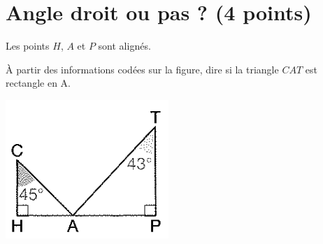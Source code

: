 \section{Angle droit ou pas ? (4 points)}

\begin{multicols}{2}
	Les points $H$, $A$  et $P$ sont alignés.
	
	\begin{questions}
		\question[4] \`A partir des informations codées sur la figure, dire si la triangle $CAT$ est rectangle en A.
	\end{questions}

	\begin{center}
		\includegraphics[scale=0.8]{img/fig}
	\end{center}
\end{multicols}